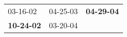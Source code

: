 \begin{supertabular}{p{0.33\columnwidth}p{0.33\columnwidth}p{0.33\columnwidth}}
          03-16-02\textsuperscript{} &  04-25-03\textsuperscript{} &  \textbf{04-29-04\textsuperscript{}} \\
 \textbf{10-24-02\textsuperscript{}} &  03-20-04\textsuperscript{} &                                      \\
\end{supertabular}
